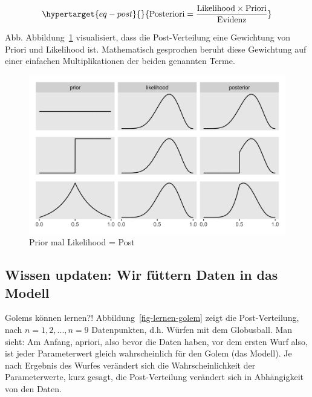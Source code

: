 \documentclass[
  a4paper,
  DIV=11]{scrreprt}
\theoremstyle{definition}
\theoremstyle{remark}
\begin{document}
\begin{equation}\protect\hypertarget{eq-post}{}{\text{Posteriori} = \frac{\text{Likelihood} \times \text{Priori}}{\text{Evidenz}}}\label{eq-post}\end{equation}

Abb. Abbildung~\ref{fig-post3} visualisiert, dass die Post-Verteilung
eine Gewichtung von Priori und Likelihood ist. Mathematisch gesprochen
beruht diese Gewichtung auf einer einfachen Multiplikationen der beiden
genannten Terme.

\begin{figure}

{\centering \includegraphics{./img/img241.png}

}

\caption{\label{fig-post3}Prior mal Likelihood = Post}

\end{figure}

\hypertarget{wissen-updaten-wir-fuxfcttern-daten-in-das-modell}{%
\subsection{Wissen updaten: Wir füttern Daten in das
Modell}\label{wissen-updaten-wir-fuxfcttern-daten-in-das-modell}}

Golems können lernen?! Abbildung~\ref{fig-lernen-golem} zeigt die
Post-Verteilung, nach \(n=1, 2, ...,n=9\) Datenpunkten, d.h. Würfen mit
dem Globusball. Man sieht: Am Anfang, apriori, also bevor die Daten
haben, vor dem ersten Wurf also, ist jeder Parameterwert gleich
wahrscheinlich für den Golem (das Modell). Je nach Ergebnis des Wurfes
verändert sich die Wahrscheinlichkeit der Parameterwerte, kurz gesagt,
die Post-Verteilung verändert sich in Abhängigkeit von den Daten.
\end{document}
